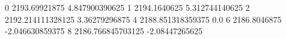 0 2193.69921875 4.847900390625
1 2194.1640625 5.312744140625
2 2192.214111328125 3.36279296875
4 2188.851318359375 0.0
6 2186.8046875 -2.046630859375
8 2186.766845703125 -2.08447265625
